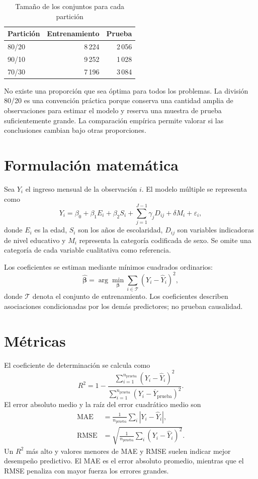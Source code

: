 \documentclass[12pt,a4paper]{article}
\begin{document}
\begin{table}[H]
\centering
\caption{Tamaño de los conjuntos para cada partición}
\begin{tabular}{lrr}
\toprule
\textbf{Partición} & \textbf{Entrenamiento} & \textbf{Prueba}\\
\midrule
80/20 & 8\,224 & 2\,056\\
90/10 & 9\,252 & 1\,028\\
70/30 & 7\,196 & 3\,084\\
\bottomrule
\end{tabular}
\end{table}

No existe una proporción que sea óptima para todos los problemas. La división 80/20 es una convención práctica porque conserva una cantidad amplia de observaciones para estimar el modelo y reserva una muestra de prueba suficientemente grande. La comparación empírica permite valorar si las conclusiones cambian bajo otras proporciones.

\section{Formulación matemática}
Sea $Y_i$ el ingreso mensual de la observación $i$. El modelo múltiple se representa como
\begin{equation}
Y_i=\beta_0+\beta_1 E_i+\beta_2 S_i+
\sum_{j=1}^{J-1}\gamma_jD_{ij}+\delta M_i+\varepsilon_i,
\end{equation}
donde $E_i$ es la edad, $S_i$ son los años de escolaridad, $D_{ij}$ son variables indicadoras de nivel educativo y $M_i$ representa la categoría codificada de sexo. Se omite una categoría de cada variable cualitativa como referencia.

Los coeficientes se estiman mediante mínimos cuadrados ordinarios:
\begin{equation}
\widehat{\boldsymbol{\beta}}=
\arg\min_{\boldsymbol{\beta}}
\sum_{i\in\mathcal{T}}(Y_i-\widehat{Y}_i)^2,
\end{equation}
donde $\mathcal{T}$ denota el conjunto de entrenamiento. Los coeficientes describen asociaciones condicionadas por los demás predictores; no prueban causalidad.

\section{Métricas}
El coeficiente de determinación se calcula como
\begin{equation}
R^2=1-\frac{\sum_{i=1}^{n_{\mathrm{prueba}}}(Y_i-\widehat{Y}_i)^2}
{\sum_{i=1}^{n_{\mathrm{prueba}}}(Y_i-\overline{Y}_{\mathrm{prueba}})^2}.
\end{equation}
El error absoluto medio y la raíz del error cuadrático medio son
\begin{align}
\mathrm{MAE}&=\frac{1}{n_{\mathrm{prueba}}}\sum_i|Y_i-\widehat{Y}_i|,\\
\mathrm{RMSE}&=\sqrt{\frac{1}{n_{\mathrm{prueba}}}\sum_i(Y_i-\widehat{Y}_i)^2}.
\end{align}
Un $R^2$ más alto y valores menores de MAE y RMSE suelen indicar mejor desempeño predictivo. El MAE es el error absoluto promedio, mientras que el RMSE penaliza con mayor fuerza los errores grandes.
\end{document}
